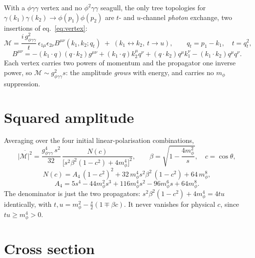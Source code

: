 \documentclass{article}
\begin{document}
With a $\phi\gamma\gamma$ vertex and no $\phi^2\gamma\gamma$ seagull, the only
tree topologies for $\gamma(k_1)\gamma(k_2)\to\phi(p_1)\phi(p_2)$ are
$t$- and $u$-channel \emph{photon} exchange, two insertions of
eq.~\eqref{eq:vertex}:
%
\begin{equation}
  \mathcal{M} = \frac{i\,g_{\phi\gamma\gamma}^2}{t}\,
    \epsilon_{1\mu}\epsilon_{2\nu}B^{\mu\nu}(k_1,k_2;q_t)
  \;+\;(k_1\leftrightarrow k_2,\ t\to u),
  \qquad q_t = p_1-k_1,\quad t=q_t^2,
\end{equation}
%
\begin{equation}
  B^{\mu\nu}= -(k_1\!\cdot\! q)(q\!\cdot\! k_2)g^{\mu\nu}
   + (k_1\!\cdot\! q)k_2^\mu q^\nu + (q\!\cdot\! k_2)q^\mu k_1^\nu
   - (k_1\!\cdot\! k_2)q^\mu q^\nu .
\end{equation}
%
Each vertex carries two powers of momentum and the propagator one inverse
power, so $\mathcal{M}\sim g_{\phi\gamma\gamma}^2 s$: the amplitude
\emph{grows} with energy, and carries no $m_\phi$ suppression.

\section{Squared amplitude}

Averaging over the four initial linear-polarisation combinations,
%
\begin{equation}
  \overline{|\mathcal{M}|^2}
  = \frac{g_{\phi\gamma\gamma}^4\,s^2}{32}\,\frac{N(c)}{\big[s^2\beta^2(1-c^2)+4m_\phi^4\big]^2},
  \qquad
  \beta=\sqrt{1-\frac{4m_\phi^2}{s}},\quad c=\cos\theta,
  \label{eq:Msq}
\end{equation}
%
\begin{equation}
  N(c) = A_4\,(1-c^2)^2 + 32\,m_\phi^4 s^2\beta^2\,(1-c^2) + 64\,m_\phi^8,
\end{equation}
\begin{equation}
  A_4 = 5s^4 - 44m_\phi^2 s^3 + 116 m_\phi^4 s^2 - 96 m_\phi^6 s + 64 m_\phi^8 .
\end{equation}
%
The denominator is just the two propagators: $s^2\beta^2(1-c^2)+4m_\phi^4 = 4tu$
identically, with $t,u = m_\phi^2 - \tfrac{s}{2}(1\mp\beta c)$. It never
vanishes for physical $c$, since $tu\ge m_\phi^4>0$.

\section{Cross section}
\end{document}
